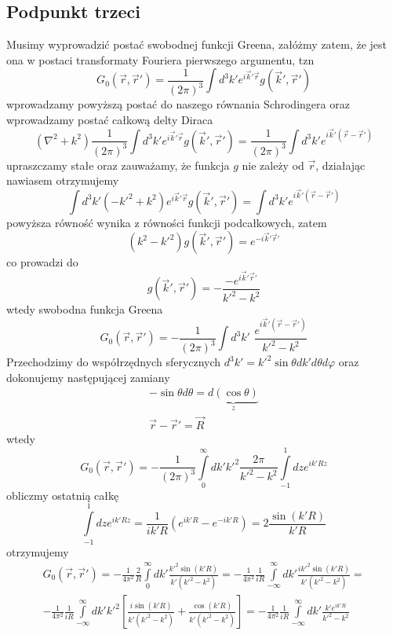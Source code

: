 \documentclass[a4paper,12pt]{article}
\begin{document}
    	\subsection{Podpunkt trzeci}
    		Musimy wyprowadzić postać swobodnej funkcji Greena, załóżmy zatem, że jest ona w postaci transformaty Fouriera pierwszego argumentu, tzn
    		$$
    			G_0(\vec{r},\vec{r}') = \frac{1}{(2\pi)^3}\int d^3k' e^{i\vec{k}'\vec{r}}g(\vec{k}',\vec{r}')
    		$$
    		wprowadzamy powyższą postać do naszego równania Schrodingera oraz wprowadzamy postać całkową delty Diraca
    		$$
    			(\nabla^2+k^2)\frac{1}{(2\pi)^3}\int d^3k' e^{i\vec{k}'\vec{r}}g(\vec{k}',\vec{r} ') = \frac{1}{(2\pi)^3}\int d^3 k' e^{i\vec{k}'(\vec{r}-\vec{r}')}
    		$$
    		upraszczamy stałe oraz zauważamy, że funkcja $g$ nie zależy od $\vec{r}$, działając nawiasem otrzymujemy
    		$$
    			\int d^3 k' (-k'^2+k^2)e^{i\vec{k}'\vec{r}}g(\vec{k}',\vec{r} ') = \int d^3 k' e^{i\vec{k}'(\vec{r}-\vec{r}')}
    		$$
    		powyższa równość wynika z równości funkcji podcałkowych, zatem
    		$$
    			(k^2-k'^2)g(\vec{k}',\vec{r} ') = e^{-i\vec{k}'\vec{r}'}
    		$$
    		co prowadzi do
    		$$
    			g(\vec{k}',\vec{r} ') = -\frac{-e^{i\vec{k}'\vec{r}'}}{k'^2-k^2}
    		$$
    		wtedy swobodna funkcja Greena
    		$$
    			G_0(\vec{r},\vec{r}') = -\frac{1}{(2\pi)^3}\int d^3k'\,\,\frac{e^{i\vec{k}'(\vec{r}-\vec{r}')}}{k'^2-k^2}
    		$$
    		Przechodzimy do współrzędnych sferycznych $d^3k' = k'^2 \sin\theta dk' d\theta d\varphi$ oraz dokonujemy następującej zamiany
    		$$
    		\begin{matrix}
    			-\sin\theta d\theta = \underbrace{d(\cos\theta)}_z \\
    			\vec{r}-\vec{r}' = \vec{R}
    		\end{matrix}
    		$$
    		wtedy
    		$$
    			G_0(\vec{r},\vec{r}') =  -\frac{1}{(2\pi)^3}\int\limits_0^\infty dk'k'^2\frac{2\pi}{k'^2-k^2}\int\limits_{-1}^1 dz e^{ik' Rz}
    		$$
    		obliczmy ostatnią całkę
    		$$
    			\int\limits_{-1}^1 dz e^{ik' Rz} = \frac{1}{ik'R}\left(e^{ik'R}-e^{-ik'R} \right) = 2\frac{\sin(k'R)}{k' R}
    		$$
    		otrzymujemy
    		$$
    		\begin{gathered}
    				G_0(\vec{r},\vec{r}') = -\frac{1}{4\pi^2}\frac{2}{R}\int\limits_0^\infty dk' \frac{k'^2\sin(k'R)}{k'(k'^2-k^2)} = -\frac{1}{4\pi^2}\frac{1}{iR}\int\limits_{-\infty}^\infty dk' \frac{ik'^2\sin(k'R)}{k'(k'^2-k^2)} = \\ 
    				-\frac{1}{4\pi^2}\frac{1}{iR}\int\limits_{-\infty}^\infty dk' k'^2\left[\frac{i\sin(k'R)}{k'(k'^2-k^2)}+\frac{\cos(k'R)}{k'(k'^2-k^2)} \right] = 
    				-\frac{1}{4\pi^2}\frac{1}{iR}\int\limits_{-\infty}^\infty dk' \frac{k'e^{ik'R}}{k'^2-k^2}
    		\end{gathered}
    		$$
\end{document}
